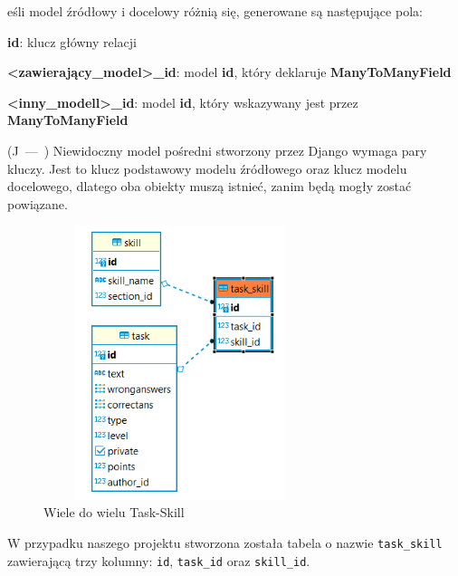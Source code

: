 \documentclass[oneside,polski,logo,indent]{amuthesis}
\let\oldquote\quote
\let\endoldquote\endquote
\renewenvironment{quote}[2][]
  {\if\relax\detokenize{#1}\relax
     \def\quoteauthor{#2}%
   \else
     \def\quoteauthor{#2~---~#1}%
   \fi
   \oldquote}
  {\par\nobreak\smallskip\hfill(\quoteauthor)%
   \endoldquote\addvspace{\bigskipamount}}
\begin{document}
\begin{enumerate}
\begin{enumerate}
\begin{quote}
Jeśli model źródłowy i docelowy różnią się, generowane są następujące pola:

\textbf{id}: klucz główny relacji

\textbf{<zawierający\_model>\_id}: model \textbf{id}, który deklaruje \textbf{ManyToManyField}

\textbf{<inny\_modell>\_id}: model \textbf{id}, który wskazywany jest przez \textbf{ManyToManyField}
\end{quote}
Niewidoczny model pośredni stworzony przez Django wymaga pary kluczy. Jest to klucz podstawowy modelu źródłowego oraz klucz modelu docelowego, dlatego oba obiekty muszą istnieć, zanim będą mogły zostać powiązane.

\begin{figure}[H]
  \centering
  \includegraphics[width=8cm, height=8cm]{task_skill.png}
  \caption{Wiele do wielu Task-Skill}
  \label{obraz-przyklad}
\end{figure}

W przypadku naszego projektu stworzona została tabela o nazwie \texttt{task\_skill} zawierającą trzy kolumny: \texttt{id}, \texttt{task\_id} oraz \texttt{skill\_id}.

\end{enumerate}
\end{enumerate}
\end{document}

